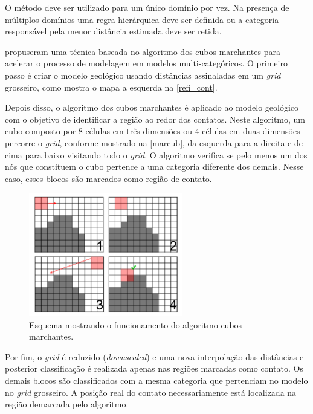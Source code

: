 O método deve ser utilizado para um único domínio por vez. Na presença de múltiplos domínios uma regra hierárquica deve ser definida ou a categoria responsável pela menor distância estimada deve ser retida.

 \label{bound_ref}

 propuseram uma técnica baseada no algoritmo dos cubos marchantes \cite{lorensen1987marching} para acelerar o processo de modelagem em modelos multi-categóricos. O primeiro passo é criar o modelo geológico usando distâncias assinaladas em um \textit{grid} grosseiro, como mostra o mapa a esquerda na \autoref{refi_cont}. 

Depois disso, o algoritmo dos cubos marchantes é aplicado ao modelo geológico com o objetivo de identificar a região ao redor dos contatos. Neste algoritmo, um cubo composto por 8 células em três dimensões ou 4 células em duas dimensões percorre o \textit{grid}, conforme mostrado na \autoref{marcub}, da esquerda para a direita e de cima para baixo visitando todo o \textit{grid}. O algoritmo verifica se pelo menos um dos nós que constituem o cubo pertence a uma categoria diferente dos demais. Nesse caso, esses blocos são marcados como região de contato. 

\begin{figure}[H]
\caption{\label{marcub} Esquema mostrando o funcionamento do algoritmo cubos marchantes.}
	\centering
		\includegraphics[width=0.6\textwidth]{capitulo_2/imagens/marching_cubes.png}
\end{figure}

Por fim, o \textit{grid} é reduzido (\textit{downscaled}) e uma nova interpolação das distâncias e posterior classificação é realizada apenas nas regiões marcadas como contato. Os demais blocos são classificados com a mesma categoria que pertenciam no modelo no \textit{grid} grosseiro. A posição real do contato necessariamente está localizada na região demarcada pelo algoritmo.

